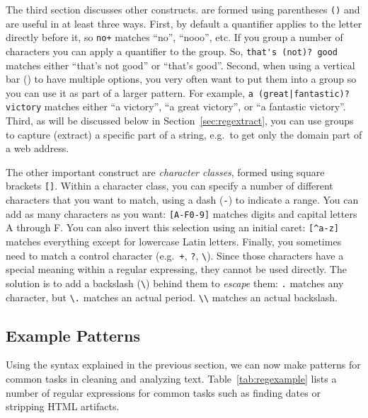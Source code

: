 The third section discusses other constructs.
 are formed using parentheses \verb|()| and are useful in at least three ways.
First, by default a quantifier applies to the letter directly before it, so \verb|no+| matches ``no'', ``nooo'', etc.
If you group a number of characters you can apply a quantifier to the group. So, \verb|that's (not)? good| matches either ``that's not good'' or 	``that's good''.
Second, when using a vertical bar (\textbar) to have multiple options, you very often want to put them into a group so you can use it as part of a larger pattern.
For example, \verb!a (great|fantastic)? victory! matches either ``a victory'', ``a great victory'', or ``a fantastic victory''.
Third, as will be discussed below in Section~\ref{sec:regextract}, you can use groups to capture (extract) a specific part of a string, e.g.\ to get only the domain part of a web address.

The other important construct are \emph{character classes}, formed using square brackets \verb|[]|.
Within a character class, you can specify a number of different characters that you want to match, using a dash (\verb|-|) to indicate a range.
You can add as many characters as you want: \verb|[A-F0-9]| matches digits and capital letters A through F.
You can also invert this selection using an initial caret: \verb|[^a-z]| matches everything except for lowercase Latin letters.
Finally, you sometimes need to match a control character  (e.g.\ \verb!+!, \verb|?|, \verb|\|). Since those characters have a special meaning within a regular expressing, they cannot be used directly. The solution is to add a backslash (\verb|\|) behind them to \emph{escape} them:
\verb|.| matches any character, but \verb|\.| matches an actual period. \verb|\\| matches an actual backslash.

\subsection{Example Patterns}

Using the syntax explained in the previous section, we can now make patterns for common tasks in cleaning and analyzing text.
Table~\ref{tab:regexample} lists a number of regular expressions for common tasks such as finding dates or stripping HTML artifacts.

%


